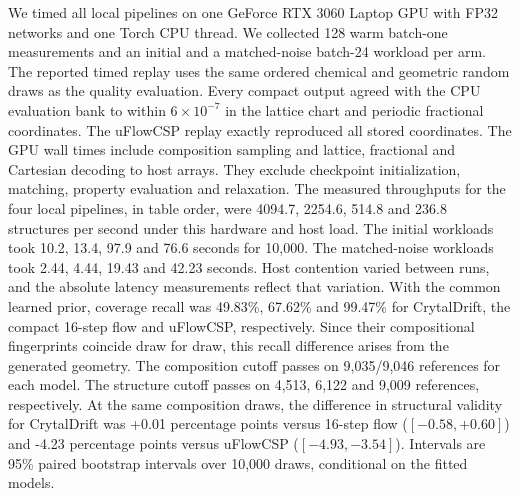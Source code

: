 We timed all local pipelines on one GeForce RTX 3060 Laptop GPU with FP32 networks and one Torch CPU thread. We collected 128 warm batch-one measurements and an initial and a matched-noise batch-24 workload per arm. The reported timed replay uses the same ordered chemical and geometric random draws as the quality evaluation. Every compact output agreed with the CPU evaluation bank to within $6\times 10^{-7}$ in the lattice chart and periodic fractional coordinates. The uFlowCSP replay exactly reproduced all stored coordinates. The GPU wall times include composition sampling and lattice, fractional and Cartesian decoding to host arrays. They exclude checkpoint initialization, matching, property evaluation and relaxation. The measured throughputs for the four local pipelines, in table order, were 
4094.7, 2254.6, 514.8 and 236.8 structures per second under this hardware and host load.
The initial workloads took 10.2, 13.4, 97.9 and 76.6 seconds for 10,000. The matched-noise workloads took 2.44, 4.44, 19.43 and 42.23 seconds. Host contention varied between runs, and the absolute latency measurements reflect that variation.
With the common learned prior, coverage recall was 49.83\%, 67.62\% and 99.47\% for CrytalDrift, the compact 16-step flow and uFlowCSP, respectively. Since their compositional fingerprints coincide draw for draw, this recall difference arises from the generated geometry.
The composition cutoff passes on 9,035/9,046 references for each model. The structure cutoff passes on 4,513, 6,122 and 9,009 references, respectively.
At the same composition draws, the difference in structural validity for CrytalDrift was +0.01 percentage points versus 16-step flow ($[-0.58,+0.60]$) and -4.23 percentage points versus uFlowCSP ($[-4.93,-3.54]$). Intervals are 95\% paired bootstrap intervals over 10,000 draws, conditional on the fitted models.

